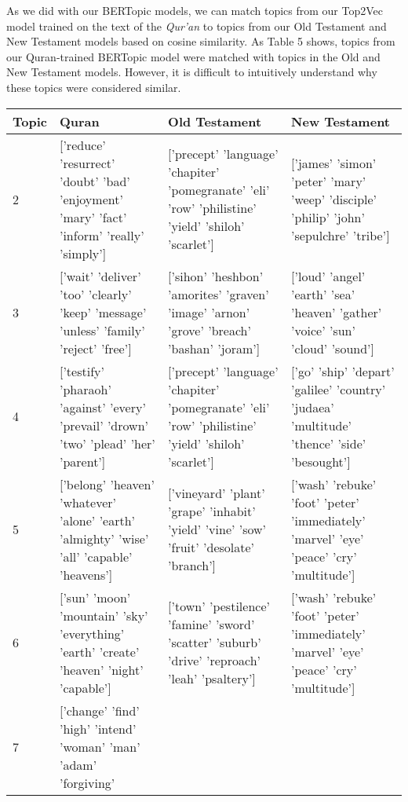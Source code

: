 \documentclass{article}
\begin{document}
    As we did with our BERTopic models, we can match topics from our Top2Vec model trained on the text of the \textit{Qur'an} to topics from our Old Testament and New Testament models based on cosine similarity. As Table 5 shows, topics from our Quran-trained BERTopic model were matched with topics in the Old and New Testament models. However, it is difficult to intuitively understand why these topics were considered similar.\\

    \begin{table}[H]
        \centering
        \begin{tabular}{|p{1cm}|p{4cm}|p{4cm}|p{4cm}|}
        \toprule
        Topic & Quran & Old Testament & New Testament \\
        \midrule
        2 & ['reduce' 'resurrect' 'doubt' 'bad' 'enjoyment' 'mary' 'fact' 'inform'
         'really' 'simply'] & ['precept' 'language' 'chapiter' 'pomegranate' 'eli' 'row' 'philistine' 'yield' 'shiloh' 'scarlet'] & ['james' 'simon' 'peter' 'mary' 'weep' 'disciple' 'philip' 'john' 'sepulchre' 'tribe'] \\
         \hline
        3 & ['wait' 'deliver' 'too' 'clearly' 'keep' 'message' 'unless' 'family'
         'reject' 'free'] & ['sihon' 'heshbon' 'amorites' 'graven' 'image' 'arnon' 'grove' 'breach' 'bashan' 'joram'] & ['loud' 'angel' 'earth' 'sea' 'heaven' 'gather' 'voice' 'sun' 'cloud' 'sound'] \\
         \hline
        4 & ['testify' 'pharaoh' 'against' 'every' 'prevail' 'drown' 'two' 'plead'
         'her' 'parent'] & ['precept' 'language' 'chapiter' 'pomegranate' 'eli' 'row' 'philistine' 'yield' 'shiloh' 'scarlet'] & ['go' 'ship' 'depart' 'galilee' 'country' 'judaea' 'multitude' 'thence'  'side' 'besought'] \\
         \hline
        5 & ['belong' 'heaven' 'whatever' 'alone' 'earth' 'almighty' 'wise' 'all'
         'capable' 'heavens'] & ['vineyard' 'plant' 'grape' 'inhabit' 'yield' 'vine' 'sow' 'fruit' 'desolate' 'branch'] & ['wash' 'rebuke' 'foot' 'peter' 'immediately' 'marvel' 'eye' 'peace' 'cry' 'multitude'] \\
         \hline
        6 & ['sun' 'moon' 'mountain' 'sky' 'everything' 'earth' 'create' 'heaven'
         'night' 'capable'] & ['town' 'pestilence' 'famine' 'sword' 'scatter' 'suburb' 'drive' 'reproach' 'leah' 'psaltery'] & ['wash' 'rebuke' 'foot' 'peter' 'immediately' 'marvel' 'eye' 'peace' 'cry' 'multitude'] \\
         \hline
        7 & ['change' 'find' 'high' 'intend' 'woman' 'man' 'adam' 'forgiving'

\end{tabular}
\end{table}
\end{document}
